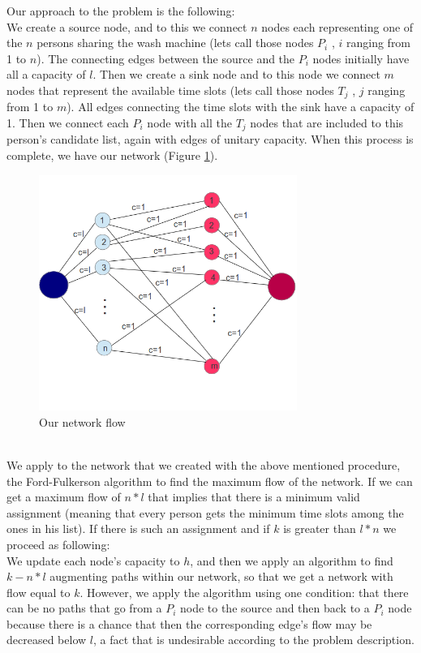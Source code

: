 Our approach to the problem is the following:\\
We create a source node, and to this we connect $n$ nodes each representing one of the $n$ persons sharing the wash machine (lets call those nodes $P_i$ , $i$ ranging from 1 to $n$). The connecting edges between the source and the $P_i$ nodes initially have all a capacity of $l$. Then we create a sink node and to this node we connect $m$ nodes that represent the available time slots (lets call those nodes $T_j$ , $j$ ranging from 1 to $m$). All edges connecting the time slots with the sink have a capacity of 1. Then we connect each $P_i$ node with all the $T_j$ nodes that are included to this person's candidate list, again with edges of unitary capacity. When this process is complete, we have our network (Figure \ref{fig:prob3}).\\
\begin{figure}[ht]
\centering
\includegraphics[width=0.75\textwidth]{prob3}%
\caption{Our network flow}%
\label{fig:prob3}%
\end{figure}
\\
We apply to the network that we created with the above mentioned procedure, the Ford-Fulkerson algorithm to find the maximum flow of the network. If we can get a maximum flow of $n*l$ that implies that there is a minimum valid assignment (meaning that every person gets the minimum time slots among the ones in his list). If there is such an assignment and if $k$ is greater than $l*n$ we proceed as following:\\
We update each node's capacity to $h$, and then we apply an algorithm to find ${k-n*l}$ augmenting paths within our network, so that we get a network with flow equal to $k$. However, we apply the algorithm using one condition: that there can be no paths that go from a $P_i$ node to the source and then back to a $P_i$ node because there is a chance that then the corresponding edge's flow may be decreased below $l$, a fact that is undesirable according to the problem description.\\
